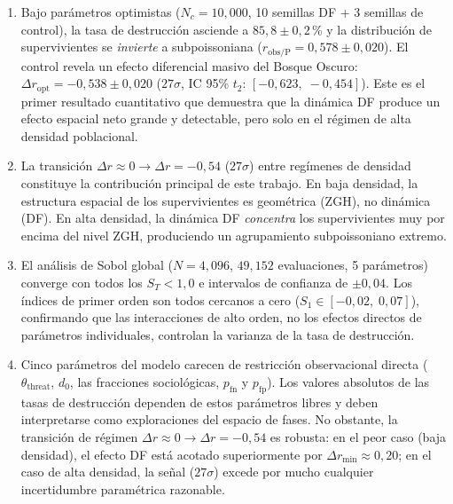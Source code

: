 \documentclass[11pt,a4paper,onecolumn]{article}
\begin{document}
\begin{table}[h]
\begin{enumerate}
  \item Bajo parámetros optimistas ($N_c = 10{,}000$, 10 semillas DF +
        3 semillas de control), la tasa de destrucción asciende a
        $85{,}8 \pm 0{,}2$\,\% y la distribución de supervivientes se
        \emph{invierte} a subpoissoniana
        ($r_\text{obs/P} = 0{,}578 \pm 0{,}020$).
        El control revela un efecto diferencial masivo del Bosque Oscuro:
        $\Delta r_\text{opt} = -0{,}538 \pm 0{,}020$ ($27\sigma$,
        IC 95\% $t_2$: $[-0{,}623,\; -0{,}454]$).
        Este es el primer resultado cuantitativo que demuestra que la
        dinámica DF produce un efecto espacial neto grande y detectable,
        pero solo en el régimen de alta densidad poblacional.

  \item La transición $\Delta r \approx 0 \to \Delta r = -0{,}54$
        ($27\sigma$) entre regímenes de densidad constituye la
        contribución principal de este trabajo.
        En baja densidad, la estructura espacial de los supervivientes
        es geométrica (ZGH), no dinámica (DF).
        En alta densidad, la dinámica DF \emph{concentra} los
        supervivientes muy por encima del nivel ZGH, produciendo un
        agrupamiento subpoissoniano extremo.

  \item El análisis de Sobol global ($N = 4{,}096$, $49{,}152$
        evaluaciones, 5 parámetros) converge con todos los
        $S_T < 1{,}0$ e intervalos de confianza de $\pm 0{,}04$.
        Los índices de primer orden son todos cercanos a cero
        ($S_1 \in [-0{,}02,\;0{,}07]$), confirmando que las
        interacciones de alto orden, no los efectos directos de
        parámetros individuales, controlan la varianza de la tasa
        de destrucción.

  \item Cinco parámetros del modelo carecen de restricción observacional
        directa ($\theta_\text{threat}$, $d_0$, las fracciones
        sociológicas, $p_\text{fn}$ y $p_\text{fp}$).
        Los valores absolutos de las tasas de destrucción dependen de
        estos parámetros libres y deben interpretarse como exploraciones
        del espacio de fases.
        No obstante, la transición de régimen $\Delta r \approx 0 \to
        \Delta r = -0{,}54$ es robusta: en el peor caso (baja densidad),
        el efecto DF está acotado superiormente por
        $\Delta r_\text{min} \approx 0{,}20$; en el caso de alta
        densidad, la señal ($27\sigma$) excede por mucho cualquier
        incertidumbre paramétrica razonable.
\end{enumerate}


\end{table}
\end{document}
